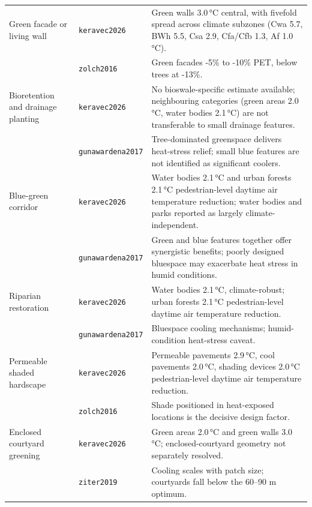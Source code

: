 \begin{longtable}{@{}>{\raggedright\arraybackslash}p{30mm} l
                    >{\raggedright\arraybackslash}p{72mm}@{}}
\addlinespace
Green facade or living wall & \texttt{keravec2026} &
Green walls 3.0\,\si{\degreeCelsius} central, with fivefold spread across climate subzones (Cwa 5.7, BWh 5.5, Csa 2.9, Cfa/Cfb 1.3, Af 1.0\,\si{\degreeCelsius}). \\
 & \texttt{zolch2016} &
Green facades -5\% to -10\% PET, below trees at -13\%. \\
\addlinespace
Bioretention and drainage planting & \texttt{keravec2026} &
No bioswale-specific estimate available; neighbouring categories (green areas 2.0\,\si{\degreeCelsius}, water bodies 2.1\,\si{\degreeCelsius}) are not transferable to small drainage features. \\
 & \texttt{gunawardena2017} &
Tree-dominated greenspace delivers heat-stress relief; small blue features are not identified as significant coolers. \\
\addlinespace
Blue-green corridor & \texttt{keravec2026} &
Water bodies 2.1\,\si{\degreeCelsius} and urban forests 2.1\,\si{\degreeCelsius} pedestrian-level daytime air temperature reduction; water bodies and parks reported as largely climate-independent. \\
 & \texttt{gunawardena2017} &
Green and blue features together offer synergistic benefits; poorly designed bluespace may exacerbate heat stress in humid conditions. \\
\addlinespace
Riparian restoration & \texttt{keravec2026} &
Water bodies 2.1\,\si{\degreeCelsius}, climate-robust; urban forests 2.1\,\si{\degreeCelsius} pedestrian-level daytime air temperature reduction. \\
 & \texttt{gunawardena2017} &
Bluespace cooling mechanisms; humid-condition heat-stress caveat. \\
\addlinespace
Permeable shaded hardscape & \texttt{keravec2026} &
Permeable pavements 2.9\,\si{\degreeCelsius}, cool pavements 2.0\,\si{\degreeCelsius}, shading devices 2.0\,\si{\degreeCelsius} pedestrian-level daytime air temperature reduction. \\
 & \texttt{zolch2016} &
Shade positioned in heat-exposed locations is the decisive design factor. \\
\addlinespace
Enclosed courtyard greening & \texttt{keravec2026} &
Green areas 2.0\,\si{\degreeCelsius} and green walls 3.0\,\si{\degreeCelsius}; enclosed-courtyard geometry not separately resolved. \\
 & \texttt{ziter2019} &
Cooling scales with patch size; courtyards fall below the 60--90 m optimum. \\

\end{longtable}
